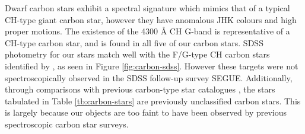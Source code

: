 \documentclass[preprint2]{aastex}
\begin{document}

	 Dwarf carbon stars exhibit a spectral signature which mimics that of a typical CH-type giant carbon star, however they have anomalous JHK colours \citep{Green;et-al_1992} and high proper motions. The existence of the 4300 \AA{} CH G-band is representative of a CH-type carbon star, and is found in all five of our carbon stars. SDSS photometry for our stars match well with the F/G-type CH carbon stars identified by \citet{Downes;et-al_2004}, as seen in Figure \ref{fig:carbon-sdss}. However these targets were not spectroscopically observed in the SDSS follow-up survey SEGUE. Additionally, through comparisons with previous carbon-type star catalogues \citep{Totten;Irwin_1998, Downes;et-al_2004, Goswami;et-al_2010}, the stars tabulated in Table \ref{tb:carbon-stars} are previously unclassified carbon stars. This is largely because our objects are too faint to have been observed by previous spectroscopic carbon star surveys.
	
\end{document}

